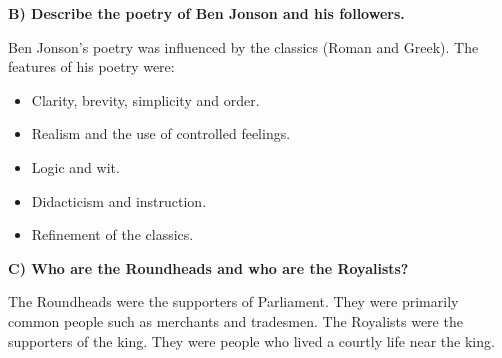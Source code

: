 \documentclass[12pt, a4paper]{article}
\begin{document}
\textbf{B) Describe the poetry of Ben Jonson and his followers.}\medbreak

Ben Jonson's poetry was influenced by the classics (Roman and Greek).
The features of his poetry were:

\begin{itemize}
  \item Clarity, brevity, simplicity and order.
  \item Realism and the use of controlled feelings.
  \item Logic and wit.
  \item Didacticism and instruction.
  \item Refinement of the classics. 
\end{itemize}

\textbf{C) Who are the Roundheads and who are the Royalists?}\medbreak

The Roundheads were the supporters of Parliament. They were primarily common people 
such as merchants and tradesmen. The Royalists were the supporters of the king. They 
were people who lived a courtly life near the king. 
\end{document}
